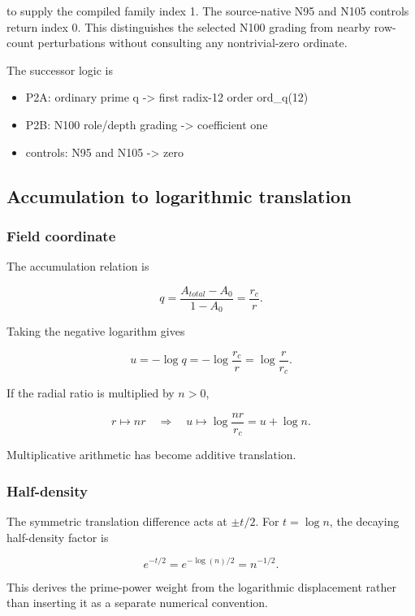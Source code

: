 to supply the compiled family index 1. The source-native N95 and N105
controls return index 0. This distinguishes the selected N100 grading
from nearby row- count perturbations without consulting any
nontrivial-zero ordinate.

The successor logic is

\begin{itemize}
\tightlist
\item
  P2A: ordinary prime q -\textgreater{} first radix-12 order ord\_q(12)
\item
  P2B: N100 role/depth grading -\textgreater{} coefficient one
\item
  controls: N95 and N105 -\textgreater{} zero
\end{itemize}

\subsection{Accumulation to logarithmic
translation}\label{viii-ch09-accumulation-to-logarithmic-translation}

\subsubsection{Field coordinate}\label{viii-ch09-field-coordinate}

The accumulation relation is

\[
q=\frac{A_{total}-A_0}{1-A_0}=\frac{r_c}{r}.
\]

Taking the negative logarithm gives

\[
u=-\log q
=-\log\frac{r_c}{r}
=\log\frac r{r_c}.
\]

If the radial ratio is multiplied by \(n>0\),

\[
r\mapsto nr
\quad\Longrightarrow\quad
u\mapsto\log\frac{nr}{r_c}=u+\log n.
\]

Multiplicative arithmetic has become additive translation.

\subsubsection{Half-density}\label{viii-ch09-half-density}

The symmetric translation difference acts at \(\pm t/2\). For
\(t=\log n\), the decaying half-density factor is

\[
e^{-t/2}=e^{-\log(n)/2}=n^{-1/2}.
\]

This derives the prime-power weight from the logarithmic displacement
rather than inserting it as a separate numerical convention.

